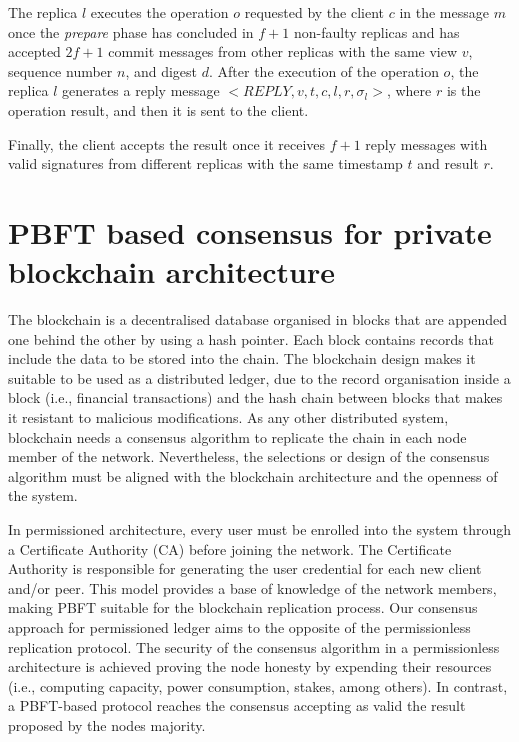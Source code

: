 \documentclass[conference]{IEEEtran}
\begin{document}
The replica $l$ executes the operation $o$ requested by the client $c$ in the message $m$ once the \textit{prepare} phase has concluded in $f+1$ non-faulty replicas and has accepted $2f+1$ commit messages from other replicas with the same view $v$, sequence number $n$, and digest $d$. After the execution of the operation $o$, the replica $l$ generates a reply message $<\textit{REPLY},v,t,c,l,r,\sigma_l>$, where $r$ is the operation result, and then it is sent to the client.

Finally, the client accepts the result once it receives $f+1$ reply messages with valid signatures from different replicas with the same timestamp $t$ and result $r$.

\section{PBFT based consensus for private blockchain architecture}
\label{PBFTHF}

The blockchain is a decentralised database organised in blocks that are appended one behind the other by using a hash pointer. Each block contains records that include the data to be stored into the chain. The blockchain design makes it suitable to be used as a distributed ledger, due to the record organisation inside a block (i.e., financial transactions) and the hash chain between blocks that makes it resistant to malicious modifications. As any other distributed system, blockchain needs a consensus algorithm to replicate the chain in each node member of the network. Nevertheless, the selections or design of the consensus algorithm must be aligned with the blockchain architecture and the openness of the system.

In permissioned architecture, every user must be enrolled into the system through a Certificate Authority (CA) before joining the network. The Certificate Authority is responsible for generating the user credential for each new client and/or peer. This model provides a base of knowledge of the network members, making PBFT suitable for the blockchain replication process. Our consensus approach for permissioned ledger aims to the opposite of the permissionless replication protocol. The security of the consensus algorithm in a permissionless architecture is achieved proving the node honesty by expending their resources (i.e., computing capacity, power consumption, stakes, among others). In contrast, a PBFT-based protocol reaches the consensus accepting as valid the result proposed by the nodes majority. 
\end{document}
